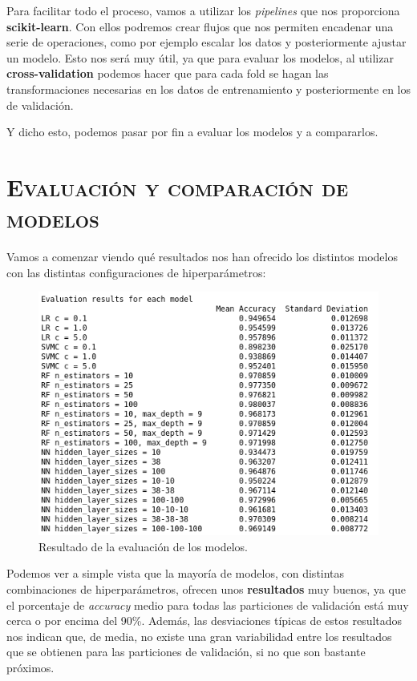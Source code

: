 \documentclass[11pt,a4paper]{article}
\begin{document}
Para facilitar todo el proceso, vamos a utilizar los \textit{pipelines} \cite{bib:pipeline} que nos proporciona \textbf{scikit-learn}. Con ellos
podremos crear flujos que nos permiten encadenar una serie de operaciones, como por ejemplo escalar los datos y posteriormente ajustar un modelo.
Esto nos será muy útil, ya que para evaluar los modelos, al utilizar \textbf{cross-validation} podemos hacer que para cada fold se hagan las
transformaciones necesarias en los datos de entrenamiento y posteriormente en los de validación.

Y dicho esto, podemos pasar por fin a evaluar los modelos y a compararlos.

\section{\textsc{Evaluación y comparación de modelos}}

Vamos a comenzar viendo qué resultados nos han ofrecido los distintos modelos con las distintas configuraciones de hiperparámetros:

\begin{figure}[H]
    \centering
    \includegraphics[scale=0.6]{img/eval-results.png}
    \caption{Resultado de la evaluación de los modelos.}
    \label{fig:eval-results}
\end{figure}

Podemos ver a simple vista que la mayoría de modelos, con distintas combinaciones de hiperparámetros, ofrecen unos \textbf{resultados} muy buenos, ya que el
porcentaje de \textit{accuracy} medio para todas las particiones de validación está muy cerca o por encima del 90\%. Además, las desviaciones
típicas de estos resultados nos indican que, de media, no existe una gran variabilidad entre los resultados que se obtienen para las particiones
de validación, si no que son bastante próximos.
\end{document}
